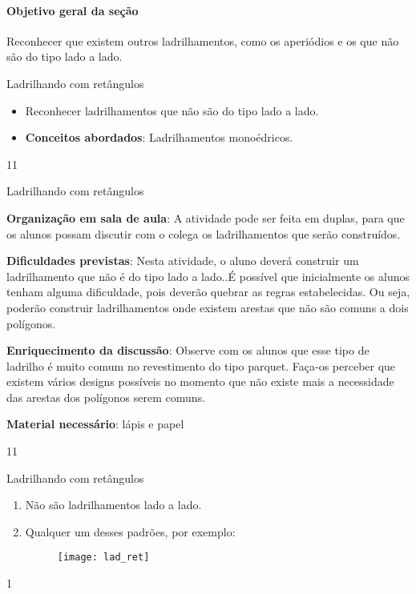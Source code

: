 \cleardoublepage
\def\currentcolor{session1}
\begin{texto}
{
\paragraph {Objetivo geral da seção}
Reconhecer que existem outros ladrilhamentos, como os aperiódios e os que não são do tipo lado a lado.}
\end{texto}
\marginpar{\vspace{-\baselineskip}}
\begin{objectives}{Ladrilhando com retângulos}
{
	\begin{itemize}
	\item Reconhecer ladrilhamentos que não são do tipo lado a lado.
	\item \textbf{Conceitos abordados}: Ladrilhamentos monoédricos.
	\end{itemize}	
}{1}{1}
\end{objectives}
\marginpar{\vspace{-2\baselineskip}}
\begin{sugestions}{Ladrilhando com retângulos}
{
	\textbf{Organização em sala de aula}: A atividade pode ser feita em duplas, para que os alunos possam discutir com o colega os ladrilhamentos que serão construídos.

	\textbf{Dificuldades previstas}: Nesta atividade, o aluno deverá construir um ladrilhamento que não é do tipo lado a lado..É possível que inicialmente os alunos tenham alguma dificuldade, pois deverão quebrar as regras estabelecidas. Ou seja, poderão construir ladrilhamentos onde existem arestas que não são comuns a dois polígonos.

	\textbf{Enriquecimento da discussão}: Observe com os alunos que esse tipo de ladrilho é muito comum no revestimento do tipo parquet. Faça-os perceber que existem vários designs possíveis no momento que não existe mais a necessidade das arestas dos polígonos serem comuns. 

	\textbf{Material necessário}: lápis e papel

}{1}{1}
\end{sugestions}
\marginpar{\vspace{-\baselineskip}}
\begin{answer}{Ladrilhando com retângulos}
{
	\begin{enumerate}
	\item Não são ladrilhamentos lado a lado.
	\item Qualquer um desses padrões, por exemplo:
	\begin{figure}[H]
	\centering
	\texttt{[image: lad\_ret]}
	\end{figure}
	\end{enumerate}
}{1}
\end{answer}
